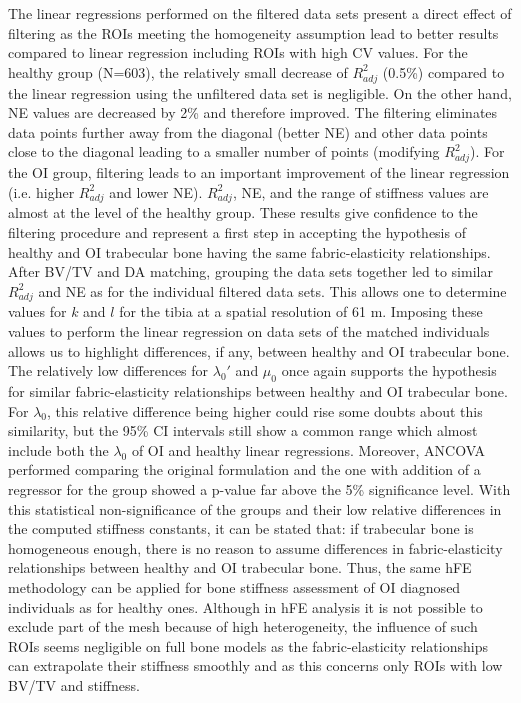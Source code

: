 \documentclass[a4paper,fleqn]{DC_ArtStyle}
\begin{document}
	The linear regressions performed on the filtered data sets present a direct effect of filtering as the ROIs meeting the homogeneity assumption lead to better results compared to linear regression including ROIs with high CV values. For the healthy group (N=603), the relatively small decrease of $R^2_{adj}$ (0.5\%) compared to the linear regression using the unfiltered data set is negligible. On the other hand, NE values are decreased by 2\% and therefore improved. The filtering eliminates data points further away from the diagonal (better NE) and other data points close to the diagonal leading to a smaller number of points (modifying $R^2_{adj}$). For the OI group, filtering leads to an important improvement of the linear regression (i.e. higher $R^2_{adj}$ and lower NE). $R^2_{adj}$, NE, and the range of stiffness values are almost at the level of the healthy group. These results give confidence to the filtering procedure and represent a first step in accepting the hypothesis of healthy and OI trabecular bone having the same fabric-elasticity relationships.\\
	
	After BV/TV and DA matching, grouping the data sets together led to similar $R^2_{adj}$ and NE as for the individual filtered data sets. This allows one to determine values for $k$ and $l$ for the tibia at a spatial resolution of 61 \si{\micro}m. Imposing these values to perform the linear regression on data sets of the matched individuals allows us to highlight differences, if any, between healthy and OI trabecular bone. The relatively low differences for $\lambda_0'$ and $\mu_0$ once again supports the hypothesis for similar fabric-elasticity relationships between healthy and OI trabecular bone. For $\lambda_0$, this relative difference being higher could rise some doubts about this similarity, but the 95\% CI intervals still show a common range which almost include both the $\lambda_0$ of OI and healthy linear regressions. Moreover, ANCOVA performed comparing the original formulation and the one with addition of a regressor for the group showed a p-value far above the 5\% significance level. With this statistical non-significance of the groups and their low relative differences in the computed stiffness constants, it can be stated that: if trabecular bone is homogeneous enough, there is no reason to assume differences in fabric-elasticity relationships between healthy and OI trabecular bone. Thus, the same hFE methodology can be applied for bone stiffness assessment of OI diagnosed individuals as for healthy ones. Although in hFE analysis it is not possible to exclude part of the mesh because of high heterogeneity, the influence of such ROIs seems negligible on full bone models as the fabric-elasticity relationships can extrapolate their stiffness smoothly and as this concerns only ROIs with low BV/TV and stiffness.\\
	
\end{document}

